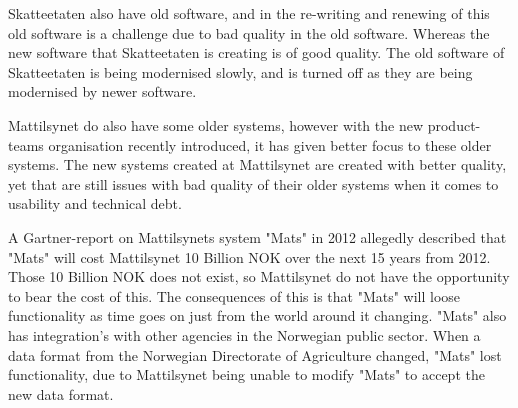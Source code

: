 Skatteetaten also have old software, and in the re-writing and renewing of this old software is a challenge due to bad quality in the old software. Whereas the new software that Skatteetaten is creating is of good quality. The old software of Skatteetaten is being modernised slowly, and is turned off as they are being modernised by newer software.

Mattilsynet do also have some older systems, however with the new product-teams organisation recently introduced, it has given better focus to these older systems. The new systems created at Mattilsynet are created with better quality, yet that are still issues with bad quality of their older systems when it comes to usability and technical debt.

A Gartner-report on Mattilsynets system "Mats" in 2012 allegedly described that "Mats" will cost Mattilsynet 10 Billion NOK over the next 15 years from 2012. Those 10 Billion NOK does not exist, so Mattilsynet do not have the opportunity to bear the cost of this. The consequences of this is that "Mats" will loose functionality as time goes on just from the world around it changing. "Mats" also has integration's with other agencies in the Norwegian public sector. When a data format from the Norwegian Directorate of Agriculture changed, "Mats" lost functionality, due to Mattilsynet being unable to modify "Mats" to accept the new data format.




